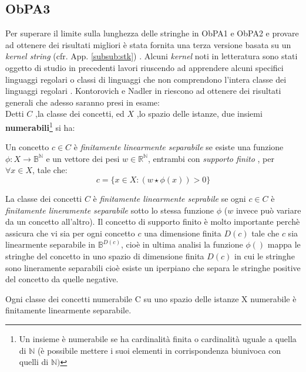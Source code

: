 \subsection{ObPA3}
Per superare il limite sulla lunghezza delle stringhe in \ac{ObPA}1 e \ac{ObPA}2 e provare ad ottenere dei risultati migliori è stata fornita una terza versione basata su un \textit{kernel string} (cfr. App. \ref{subsub:stk}) . Alcuni  \textit{kernel} noti in letteratura sono stati oggetto di studio in precedenti lavori riuscendo ad apprendere alcuni specifici linguaggi regolari o classi di linguaggi che non comprendono l'intera classe dei linguaggi regolari \cite{Clark11}\cite{Clark06}. Kontorovich e Nadler in \cite{Kontorovich09} riescono ad ottenere dei risultati generali che adesso saranno presi in esame:\\
Detti $C$ ,la classe dei concetti, ed $X$ ,lo spazio delle istanze, due insiemi \textbf{numerabili}\footnote{Un insieme è numerabile se ha cardinalità finita o cardinalità uguale a quella di $\mathbb{N}$ (è possibile mettere i suoi elementi in corrispondenza biunivoca con quelli di $\mathbb{N})$} si ha:
\begin{definizione*} Un concetto $c \in C$ è \textit{finitamente linearmente separabile} se esiste una funzione $\phi : X \to \mathbb{B}^{\mathbb{N}}$ e un vettore dei pesi $w \in \mathbb{R}^{\mathbb{N}}$, entrambi con \textit{supporto finito} , per $\forall x\in X$, tale che: 
\begin{equation*}
c = \{x \in X :  (w \star \phi(x))  > 0\}
\end{equation*}

\end{definizione*}
La classe dei concetti $C$ è \textit{finitamente linearmente seprabile} se ogni $c \in C$ è \textit{finitamente lineramente separabile} sotto lo stessa funzione $\phi$ ($w$ invece può variare da un concetto all'altro). Il concetto di supporto finito è molto importante perchè assicura che vi sia per ogni concetto $c$ una dimensione finita $D(c)$ tale che $c$ sia linearmente separabile in $\mathbb{B}^{D(c)}$, cioè in ultima analisi la funzione $\phi()$ mappa le stringhe del concetto in uno spazio di dimensione finita $D(c)$ in cui le stringhe sono lineramente separabili cioè esiste un iperpiano che separa le stringhe positive del concetto da quelle negative.
\begin{teorema}
\label{teo:clns}
Ogni classe dei concetti numerabile C su uno spazio delle istanze X numerabile è finitamente linearmente separabile. 
\end{teorema}

